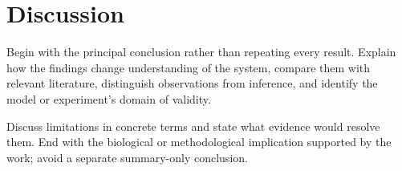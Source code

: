 \section*{Discussion}

Begin with the principal conclusion rather than repeating every result. Explain how the findings change understanding of the system, compare them with relevant literature, distinguish observations from inference, and identify the model or experiment's domain of validity.

Discuss limitations in concrete terms and state what evidence would resolve them. End with the biological or methodological implication supported by the work; avoid a separate summary-only conclusion.

